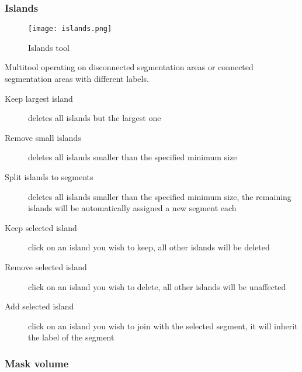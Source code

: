 \pagebreak
\subsubsection{Islands}
\begin{figure}[h]
	\begin{subfigure}{0.2\textwidth}
		
	\end{subfigure}
	\begin{subfigure}{0.2\textwidth}
		
	\end{subfigure}
\end{figure}


\begin{figure}[h!]
	\centerline{
		\texttt{[image: islands.png]}}
	\caption{Islands tool}\label{fig:islands}
\end{figure}
\noindent
Multitool operating on disconnected segmentation areas or connected segmentation areas with different labels.
\begin{description}
	\item [Keep largest island] deletes all islands but the largest one
	\item [Remove small islands] deletes all islands smaller than the specified minimum size
	\item [Split islands to segments] deletes all islands smaller than the specified minimum size, the remaining islands will be automatically assigned a new segment each
	\item [Keep selected island] click on an island you wish to keep, all other islands will be deleted
	\item [Remove selected island] click on an island you wish to delete, all other islands will be unaffected
	\item [Add selected island] click on an island you wish to join with the selected segment, it will inherit the label of the segment
\end{description}
\pagebreak

\subsubsection{Mask volume}\label{section:mask}
\begin{figure}[h]
	\begin{subfigure}{0.2\textwidth}
		
	\end{subfigure}
	\begin{subfigure}{0.2\textwidth}
		
	\end{subfigure}
\end{figure}


